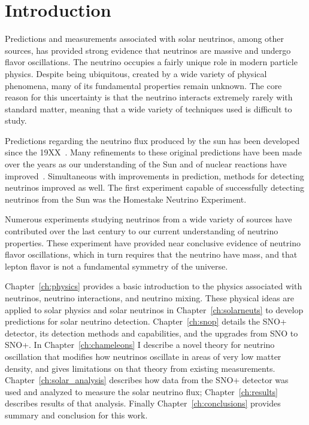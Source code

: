 
\chapter{Introduction}

\ifpdf
    \graphicspath{{introduction/figures/PNG/}{introduction/figures/PDF/}{introduction/figures/}}
\else
    \graphicspath{{introduction/figures/EPS/}{introduction/figures/}}
\fi


Predictions and measurements associated with solar neutrinos, among other
sources, has provided strong evidence that neutrinos are massive and undergo
flavor oscillations.
The neutrino occupies a fairly unique role in modern particle physics.
Despite being ubiquitous, created by a wide variety of physical phenomena,
many of its fundamental properties remain unknown.
The core reason for this uncertainty is that the neutrino interacts extremely rarely
with standard matter, meaning that a wide variety of techniques used
is difficult to study.

Predictions regarding the neutrino flux produced by the sun has been developed
since the 19XX~\cite{XXX}. Many refinements to these original predictions have
been made over the years as our understanding of the Sun and of nuclear reactions
have improved~\cite{XXX,XXX,XXX}.
Simultaneous with improvements in prediction, methods for detecting neutrinos
improved as well. The first experiment capable of successfully detecting
neutrinos from the Sun was the Homestake Neutrino Experiment.

Numerous experiments studying neutrinos from a wide variety of sources have
contributed over the last century to our current understanding of neutrino
properties.
These experiment have provided near conclusive evidence of neutrino flavor
oscillations, which in turn requires that the neutrino have mass, and that
lepton flavor is not a fundamental symmetry of the universe.

Chapter~\ref{ch:physics} provides a basic introduction to the physics associated
with neutrinos, neutrino interactions, and neutrino mixing.
These physical ideas are applied to solar physics and solar neutrinos in Chapter~\ref{ch:solarneuts}
to develop predictions for solar neutrino detection.
Chapter~\ref{ch:snop} details the SNO+ detector, its detection methods and
capabilities, and the upgrades from SNO to SNO+.
In Chapter~\ref{ch:chameleons} I describe a novel theory for neutrino oscillation
that modifies how neutrinos oscillate in areas of very low matter density,
and gives limitations on that theory from existing measurements.
Chapter~\ref{ch:solar_analysis} describes how data from the SNO+ detector
was used and analyzed to measure the solar neutrino flux;
Chapter~\ref{ch:results} describes results of that analysis.
Finally Chapter~\ref{ch:conclusions} provides summary and conclusion for
this work.
